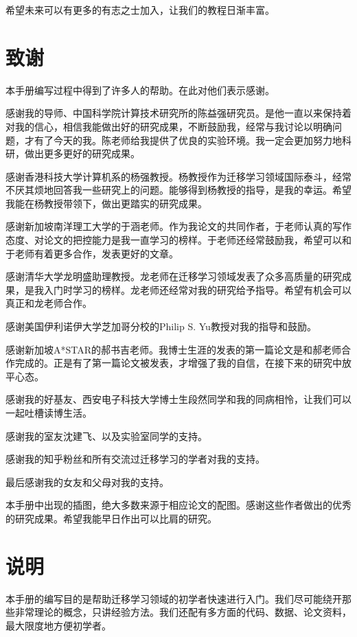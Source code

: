 希望未来可以有更多的有志之士加入，让我们的教程日渐丰富。

\newpage

\section*{致谢}

本手册编写过程中得到了许多人的帮助。在此对他们表示感谢。

感谢我的导师、中国科学院计算技术研究所的陈益强研究员。是他一直以来保持着对我的信心，相信我能做出好的研究成果，不断鼓励我，经常与我讨论以明确问题，才有了今天的我。陈老师给我提供了优良的实验环境。我一定会更加努力地科研，做出更多更好的研究成果。

感谢香港科技大学计算机系的杨强教授。杨教授作为迁移学习领域国际泰斗，经常不厌其烦地回答我一些研究上的问题。能够得到杨教授的指导，是我的幸运。希望我能在杨教授带领下，做出更踏实的研究成果。

感谢新加坡南洋理工大学的于涵老师。作为我论文的共同作者，于老师认真的写作态度、对论文的把控能力是我一直学习的榜样。于老师还经常鼓励我，希望可以和于老师有着更多合作，发表更好的文章。

感谢清华大学龙明盛助理教授。龙老师在迁移学习领域发表了众多高质量的研究成果，是我入门时学习的榜样。龙老师还经常对我的研究给予指导。希望有机会可以真正和龙老师合作。

感谢美国伊利诺伊大学芝加哥分校的Philip S. Yu教授对我的指导和鼓励。

感谢新加坡A*STAR的郝书吉老师。我博士生涯的发表的第一篇论文是和郝老师合作完成的。正是有了第一篇论文被发表，才增强了我的自信，在接下来的研究中放平心态。

感谢我的好基友、西安电子科技大学博士生段然同学和我的同病相怜，让我们可以一起吐槽读博生活。

感谢我的室友沈建飞、以及实验室同学的支持。

感谢我的知乎粉丝和所有交流过迁移学习的学者对我的支持。

最后感谢我的女友和父母对我的支持。

本手册中出现的插图，绝大多数来源于相应论文的配图。感谢这些作者做出的优秀的研究成果。希望我能早日作出可以比肩的研究。

\newpage
\section*{说明}
本手册的编写目的是帮助迁移学习领域的初学者快速进行入门。我们尽可能绕开那些非常理论的概念，只讲经验方法。我们还配有多方面的代码、数据、论文资料，最大限度地方便初学者。

